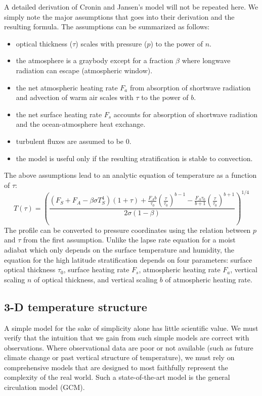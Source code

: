\documentclass{article}
\begin{document}
A detailed derivation of Cronin and Jansen's model will not be repeated here. We simply note the major assumptions that goes into their derivation and the resulting formula. The assumptions can be summarized as follows:
\begin{itemize}
\item optical thickness ($\tau$) scales with pressure ($p$) to the power of $n$.
\item the atmosphere is a graybody except for a fraction $\beta$ where longwave radiation can escape (atmospheric window).
\item the net atmospheric heating rate $F_a$ from absorption of shortwave radiation and advection of warm air scales with $\tau$ to the power of $b$.
\item the net surface heating rate $F_s$ accounts for absorption of shortwave radiation and the ocean-atmosphere heat exchange.
\item turbulent fluxes are assumed to be 0.
\item the model is useful only if the resulting stratification is stable to convection.
\end{itemize}
The above assumptions lead to an analytic equation of temperature as a function of $\tau$:
\begin{equation}
T(\tau) = \left(\frac{(F_S + F_A - \beta \sigma T_S^4)(1+\tau) + \frac{F_Ab}{\tau_0}\left(\frac{\tau}{\tau_0}\right)^{b-1}-\frac{F_A\tau_0}{b+1}\left(\frac{\tau}{\tau_0}\right)^{b+1}}{2 \sigma (1-\beta)} \right)^{1/4}
\end{equation}
The profile can be converted to pressure coordinates using the relation between $p$ and $\tau$ from the first assumption. Unlike the lapse rate equation for a moist adiabat which only depends on the surface temperature and humidity, the equation for the high latitude stratification depends on four parameters: surface optical thickness $\tau_0$, surface heating rate $F_s$, atmospheric heating rate $F_a$, vertical scaling $n$ of optical thickness, and vertical scaling $b$ of atmospheric heating rate.

\subsection{3-D temperature structure}

A simple model for the sake of simplicity alone has little scientific value. We must verify that the intuition that we gain from such simple models are correct with observations. Where observational data are poor or not available (such as future climate change or past vertical structure of temperature), we must rely on comprehensive models that are designed to most faithfully represent the complexity of the real world. Such a state-of-the-art model is the general circulation model (GCM).
\end{document}
